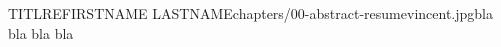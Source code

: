 

 
\begin{thesis}{TITLRE}{FIRSTNAME LASTNAME}{chapters/00-abstract-resume}{vincent.jpg}{bla bla bla bla}   
    
    
    
     
    
\end{thesis}


